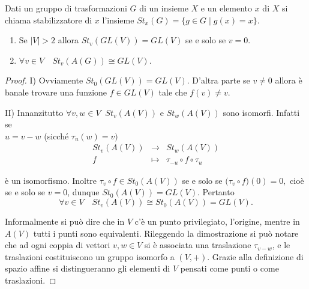 \documentclass[a4paper,12pt]{article}
\newcommand{\Got}[1]{#1}
\newcommand{\got}[1]{{#1}}
\begin{document}
 \begin{definition}
 \Got{Dati un gruppo di trasformazioni} $\got{G}$ \Got{di un insieme} $\got{X}$ \Got{e un elemento} $\got{x}$ \Got{di}
 $\got{X}$ \Got{si chiama stabilizzatore di} $\got{x}$ \Got{l'insieme} $\got{St_x(G)=\{g\in G\;|\; g(x)=x\}}$.
 \end{definition}
 
 \begin{proposition}
 \begin{enumerate}[label=\Roman*)]
	 \item Se $\got{|V|>2}$ \Got{allora} $\got{St_v(GL(V))=GL(V)}$ \Got{se e solo se} $\got{v=0}$.
	 \item $\got{\forall v\in V\quad St_v(A(G))\cong GL(V)}$.
	\end{enumerate} 
 \end{proposition}
 
 \begin{proof}
 \Got{I) Ovviamente} $\got{St_0(GL(V))=GL(V)}.$
 \Got{D'altra parte se} $\got{v\ne 0}$ \Got{allora è banale trovare una funzione} $\got{f\in GL(V)}$ \Got{tale che} $\got{f(v)\ne v.}$
  
 
 \Got{II) Innanzitutto} $\got{\forall v,w\in V\;\; St_v(A(V))}$ \Got{e} $\got{St_w(A(V))}$ \Got{sono isomorfi.
 Infatti se}\\
 $\got{u=v-w}$ \Got{(sicché} $\got{\tau_u(w)=v)}$
 \begin{eqnarray*}
	\got{St_v(A(V))} &\to & \got{St_w(A(V))} \\
	\got{f} &\mapsto & \got{\tau_{-u}}\circ\got{ f}\circ\got{\tau_u}
 \end{eqnarray*}
 
 \Got{è un isomorfismo.
 Inoltre} $\got{\tau_v}\circ\got{ f\in St_0(A(V))}$ \Got{se e solo se} $\got{(\tau_v}\circ\got{ f)(0)=0,}$ \Got{cioè se e solo se} $\got{v=0}$,
 \Got{dunque} $\got{St_0(A(V))=GL(V)}$.
 \Got{Pertanto} $$\got{\forall v\in V\quad St_v(A(V))\cong St_0(A(V))=GL(V)}.$$
 
 
 
 \Got{Informalmente si può dire che in} $\got{V}$ \Got{c'è un punto privilegiato, l'origine, mentre in} $\got{A(V)}$
 \Got{tutti i punti sono equivalenti.
 Rileggendo la dimostrazione si può notare che ad ogni coppia di vettori} $\got{v,w\in V}$ \Got{si è associata una traslazione}
 $\got{\tau_{v-w}}$, \Got{e le traslazioni costituiscono un gruppo isomorfo a} $\got{(V,+)}$.
 \Got{Grazie alla definizione di spazio affine si distingueranno gli elementi di} $\got{V}$ \Got{pensati come punti o come traslazioni.}
 \end{proof}
 
\end{document}
